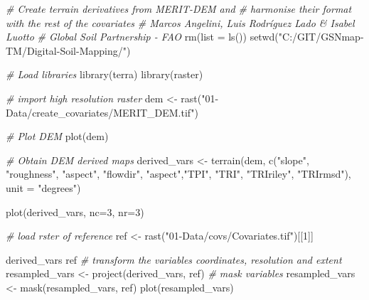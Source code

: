 \documentclass[
  10pt,
  b5paper,
  oneside]{book}
\newenvironment{Shaded}{\begin{snugshade}}{\end{snugshade}}
\newcommand{\AttributeTok}[1]{\textcolor[rgb]{0.77,0.63,0.00}{#1}}
\newcommand{\CommentTok}[1]{\textcolor[rgb]{0.56,0.35,0.01}{\textit{#1}}}
\newcommand{\DecValTok}[1]{\textcolor[rgb]{0.00,0.00,0.81}{#1}}
\newcommand{\FunctionTok}[1]{\textcolor[rgb]{0.00,0.00,0.00}{#1}}
\newcommand{\NormalTok}[1]{#1}
\newcommand{\OtherTok}[1]{\textcolor[rgb]{0.56,0.35,0.01}{#1}}
\newcommand{\StringTok}[1]{\textcolor[rgb]{0.31,0.60,0.02}{#1}}
\begin{document}
\begin{Shaded}
\begin{Highlighting}[]
\CommentTok{\# Create terrain derivatives from MERIT{-}DEM and }
\CommentTok{\# harmonise their format with the rest of the covariates }
\CommentTok{\# Marcos Angelini, Luis Rodríguez Lado \& Isabel Luotto}
\CommentTok{\# Global Soil Partnership {-} FAO}
\FunctionTok{rm}\NormalTok{(}\AttributeTok{list =} \FunctionTok{ls}\NormalTok{())}
\FunctionTok{setwd}\NormalTok{(}\StringTok{"C:/GIT/GSNmap{-}TM/Digital{-}Soil{-}Mapping/"}\NormalTok{)}

\CommentTok{\# Load libraries}
  \FunctionTok{library}\NormalTok{(terra)}
  \FunctionTok{library}\NormalTok{(raster)}

\CommentTok{\# import high resolution raster  }
\NormalTok{dem }\OtherTok{\textless{}{-}} \FunctionTok{rast}\NormalTok{(}\StringTok{"01{-}Data/create\_covariates/MERIT\_DEM.tif"}\NormalTok{)}

\CommentTok{\# Plot DEM}
\FunctionTok{plot}\NormalTok{(dem)}

\CommentTok{\# Obtain DEM derived maps}
\NormalTok{derived\_vars }\OtherTok{\textless{}{-}} \FunctionTok{terrain}\NormalTok{(dem, }
                        \FunctionTok{c}\NormalTok{(}\StringTok{"slope"}\NormalTok{, }\StringTok{"roughness"}\NormalTok{, }\StringTok{"aspect"}\NormalTok{, }\StringTok{"flowdir"}\NormalTok{, }
                          \StringTok{"aspect"}\NormalTok{,}\StringTok{"TPI"}\NormalTok{, }\StringTok{"TRI"}\NormalTok{, }\StringTok{"TRIriley"}\NormalTok{, }\StringTok{"TRIrmsd"}\NormalTok{), }
                        \AttributeTok{unit =} \StringTok{"degrees"}\NormalTok{)}

\FunctionTok{plot}\NormalTok{(derived\_vars, }\AttributeTok{nc=}\DecValTok{3}\NormalTok{, }\AttributeTok{nr=}\DecValTok{3}\NormalTok{)}

\CommentTok{\# load rster of reference}
\NormalTok{ref }\OtherTok{\textless{}{-}} \FunctionTok{rast}\NormalTok{(}\StringTok{"01{-}Data/covs/Covariates.tif"}\NormalTok{)[[}\DecValTok{1}\NormalTok{]]}

\NormalTok{derived\_vars}
\NormalTok{ref}
\CommentTok{\# transform the variable\textquotesingle{}s coordinates, resolution and extent }
\NormalTok{resampled\_vars }\OtherTok{\textless{}{-}} \FunctionTok{project}\NormalTok{(derived\_vars, ref)}
\CommentTok{\# mask variables}
\NormalTok{resampled\_vars }\OtherTok{\textless{}{-}} \FunctionTok{mask}\NormalTok{(resampled\_vars, ref)}
\FunctionTok{plot}\NormalTok{(resampled\_vars)}


\end{Highlighting}
\end{Shaded}
\end{document}
